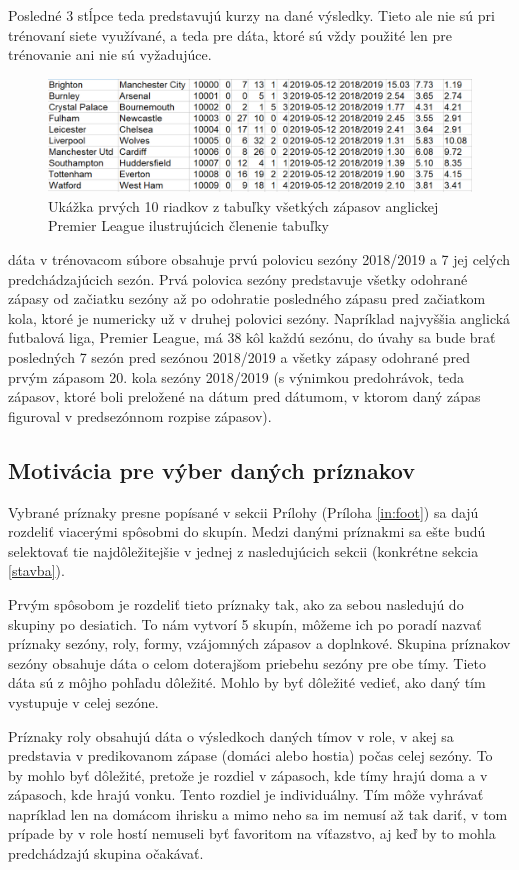 Posledné 3 stĺpce teda predstavujú kurzy na dané výsledky. Tieto ale nie sú pri trénovaní siete využívané, a teda pre dáta, ktoré sú vždy použité len pre trénovanie ani nie sú vyžadujúce.

\noindent
\begin{figure}[b]
\includegraphics[width=\textwidth]{../img/eng.png}
\caption{Ukážka prvých 10 riadkov z tabuľky všetkých zápasov anglickej Premier League ilustrujúcich členenie tabuľky}
\end{figure}
dáta v trénovacom súbore obsahuje prvú polovicu sezóny 2018/2019 a 7 jej celých predchádzajúcich sezón. Prvá polovica sezóny predstavuje všetky odohrané zápasy od začiatku sezóny až po odohratie posledného zápasu pred začiatkom kola, ktoré je numericky už v druhej polovici sezóny. 
Napríklad najvyššia anglická futbalová liga, Premier League, má 38 kôl každú sezónu, do úvahy sa bude brať posledných 7 sezón pred sezónou 2018/2019 a všetky zápasy odohrané pred prvým zápasom 20. kola sezóny 2018/2019 (s výnimkou predohrávok, teda zápasov, ktoré boli preložené na dátum pred dátumom, v ktorom daný zápas figuroval v predsezónnom rozpise zápasov).


\subsection{Motivácia pre výber daných príznakov}
Vybrané príznaky presne popísané v sekcii Prílohy (Príloha \ref{in:foot}) sa dajú rozdeliť viacerými spôsobmi do skupín.
Medzi danými príznakmi sa ešte budú selektovať tie najdôležitejšie v jednej z nasledujúcich sekcii (konkrétne sekcia \ref{stavba}).

Prvým spôsobom je rozdeliť tieto príznaky tak, ako za sebou nasledujú do skupiny po desiatich. To nám vytvorí 5 skupín, môžeme ich po poradí nazvať príznaky sezóny, roly, formy, vzájomných zápasov a doplnkové.
Skupina príznakov sezóny obsahuje dáta o celom doterajšom priebehu sezóny pre obe tímy. Tieto dáta sú z môjho pohľadu dôležité. Mohlo by byť dôležité vedieť, ako daný tím vystupuje v celej sezóne.

Príznaky roly obsahujú dáta o výsledkoch daných tímov v role, v akej sa predstavia v predikovanom zápase (domáci alebo hostia) počas celej sezóny. To by mohlo byť dôležité, pretože je rozdiel v zápasoch, kde tímy hrajú doma a v zápasoch, kde hrajú vonku. Tento rozdiel je individuálny. Tím môže vyhrávať napríklad len na domácom ihrisku a mimo neho sa im nemusí až tak dariť, v tom prípade by v role hostí nemuseli byť favoritom na víťazstvo, aj keď by to mohla predchádzajú skupina očakávať.

